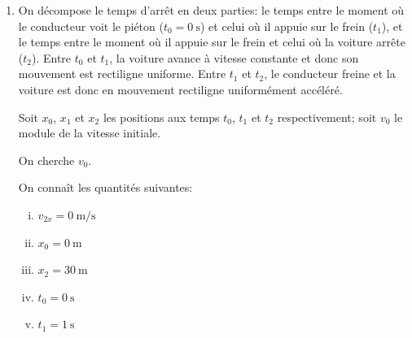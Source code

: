 \begin{enumerate}[a]
  \begin{marginfigure}
  \end{marginfigure}
  \item On décompose le temps d'arrêt en deux parties: le temps entre le moment
    où le conducteur voit le piéton ($t_0 = \SI{0}{\second}$) et celui où il
    appuie sur le frein ($t_1$), et le temps entre le moment où il appuie sur
    le frein et celui où la voiture arrête ($t_2$).  Entre $t_0$ et $t_1$, la
    voiture avance à vitesse constante et donc son mouvement est rectiligne
    uniforme.  Entre $t_1$ et $t_2$, le conducteur freine et la voiture est
    donc en mouvement rectiligne uniformément accéléré.

    Soit $x_0$, $x_1$ et $x_2$ les positions aux temps $t_0$, $t_1$ et $t_2$
    respectivement; soit $v_0$ le module de la vitesse initiale.

    On cherche $v_{0}$.

    On connaît les quantités suivantes:
    \begin{enumerate}[i.]
      \item $v_{2x} = \SI{0}{\meter\per\second}$
      \item $x_0 = \SI{0}{\meter}$
      \item $x_2 = \SI{30}{\meter}$
      \item $t_0 = \SI{0}{\second}$
      \item $t_1 = \SI{1}{\second}$
    \end{enumerate}


\end{enumerate}
